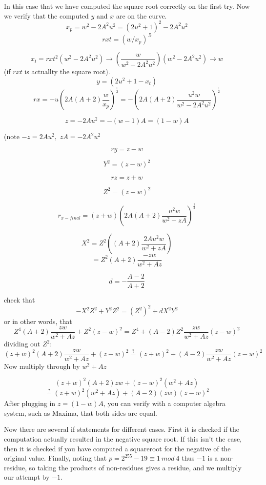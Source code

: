 \documentclass[12pt,oneside,english]{amsart}
\numberwithin{equation}{section}
\numberwithin{figure}{section}
\theoremstyle{plain}
\theoremstyle{plain}
\theoremstyle{remark}
\theoremstyle{plain}
\theoremstyle{remark}
\theoremstyle{remark}
\theoremstyle{plain}
\theoremstyle{definition}
\begin{document}
In this case that we have computed the square root correctly on the first try. Now we verify that the computed $y$ and $x$ are on the curve. 
\[
x_{p}=w^{2}-2A^{2}u^{2}=\left(2u^{2}+1\right)^{2}-2A^{2}u^{2}
\]
\[
rxt=\left(w/x_{p}\right)^{.5}
\]


\[
x_{t}=rxt^{2}\left(w^{2}-2A^{2}u^{2}\right)\to\left(\frac{w}{w^{2}-2A^{2}u^{2}}\right)\left(w^{2}-2A^{2}u^{2}\right)\to w
\]
(if $rxt$ is actuallty the square root). 
\[
y=\left(2u^{2}+1-x_{t}\right)
\]
\[
rx=-u\left(2A\left(A+2\right)\frac{w}{x_{p}}\right)^{\frac{1}{2}}=-\left(2A\left(A+2\right)\frac{u^{2}w}{w^{2}-2A^{2}u^{2}}\right)^{\frac{1}{2}}
\]


\[
z=-2Au^{2}=-\left(w-1\right)A=\left(1-w\right)A
\]


(note $-z=2Au^{2},$ $zA=-2A^{2}u^{2}$

\[
ry=z-w
\]


\[
Y^{2}=\left(z-w\right)^{2}
\]


\[
rz=z+w
\]


\[
Z^{2}=\left(z+w\right)^{2}
\]


\[
r_{x-final}=\left(z+w\right)\left(2A\left(A+2\right)\frac{u^{2}w}{w^{2}+zA}\right)^{\frac{1}{2}}
\]


\[
X^{2}=Z^{2}\left(\left(A+2\right)\frac{2Au^{2}w}{w^{2}+zA}\right)
\]
\[
=Z^{2}\left(A+2\right)\frac{-zw}{w^{2}+Az}
\]


\[
d=-\frac{A-2}{A+2}
\]


check that 
\[
-X^{2}Z^{2}+Y^{2}Z^{2}=\left(Z^{2}\right)^{2}+dX^{2}Y^{2}
\]
 or in other words, that 
\[
Z^{4}\left(A+2\right)\frac{zw}{w^{2}+Az}+Z^{2}\left(z-w\right)^{2}=Z^{4}+\left(A-2\right)Z^{2}\frac{zw}{w^{2}+Az}\left(z-w\right)^{2}
\]
 dividing out $Z^{2}$:
\[
\left(z+w\right)^{2}\left(A+2\right)\frac{zw}{w^{2}+Az}+\left(z-w\right)^{2}\overset{?}{=}\left(z+w\right)^{2}+\left(A-2\right)\frac{zw}{w^{2}+Az}\left(z-w\right)^{2}
\]
 Now multiply through by $w^{2}+Az$ 

\[
\left(z+w\right)^{2}\left(A+2\right)zw+\left(z-w\right)^{2}\left(w^{2}+Az\right)
\]
\[\overset{?}{=}\left(z+w\right)^{2}\left(w^{2}+Az\right)+\left(A-2\right)\left(zw\right)\left(z-w\right)^{2}
\]
 After plugging in $z=\left(1-w\right)A$, you can verify with a computer
algebra system, such as Maxima, that both sides are equal. 
\par
Now there are several if statements for different cases. First it is checked if the computation actually resulted in the negative square root. If this isn't the case, then it is checked if you have computed a squareroot for the negative of the original value. Finally, noting that $p = 2^255 - 19\equiv 1\ mod\ 4$ thus $-1$ is a non-residue, so taking the products of non-residues gives a residue, and we multiply our attempt by $-1$. 




\end{document}
